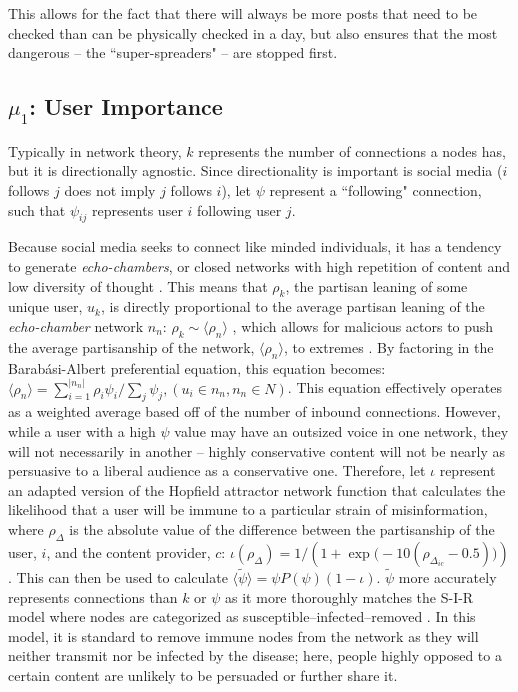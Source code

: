 \documentclass[preprint,12pt]{elsarticle}
\begin{document}
This allows for the fact that there will always be more posts that need to be checked than can be physically checked in a day, but also ensures that the most dangerous -- the ``super-spreaders" -- are stopped first.

\subsection{$\mu_1$: User Importance}
\label{mu1}
Typically in network theory, $k$ represents the number of connections a nodes has, but it is directionally agnostic. Since directionality is important is social media ($i$ follows $j$ does not imply $j$ follows $i$), let $\psi$ represent a ``following" connection, such that $\psi_{ij}$ represents user $i$ following user $j$. 

Because social media seeks to connect like minded individuals, it has a tendency to generate \textit{echo-chambers}, or closed networks with high repetition of content and low diversity of thought \cite{adibi2005proceedings, bastian2009international, pariser2011filter,bozdag2015breaking}. This means that $\rho_k$, the partisan leaning of some unique user, $u_k$, is directly proportional to the average partisan leaning of the \textit{echo-chamber} network $n_n$: $\rho_k \sim \langle \rho_n \rangle$ \cite{asch1956studies,bullock2007experiments}, which allows for malicious actors to push the average partisanship of the network, $\langle \rho_n \rangle$, to extremes \cite{shin2018diffusion,bastos2019brexit,hegelich2016social,mueller2019mueller}. By factoring in the Barab{\'a}si-Albert preferential equation, this equation becomes: $\langle \rho_n \rangle = \sum_{i=1}^{|n_n|}\rho_i\psi_i / \sum_{j}\psi_j, (u_i \in n_n, n_n \in N)$. This equation effectively operates as a weighted average based off of the number of inbound connections. However, while a user with a high $\psi$ value may have an outsized voice in one network, they will not necessarily in another -- highly conservative content will not be nearly as persuasive to a liberal audience as a conservative one. Therefore, let $\iota$ represent an adapted version of the Hopfield attractor network \cite{hopfield1982neural,hopfield1985neural,nowak1998toward,kitts1999structural,macy2003polarization} function that calculates the likelihood that a user will be immune to a particular strain of misinformation, where $\rho_{\Delta}$ is the absolute value of the difference between the partisanship of the user, $i$, and the content provider, $c$: $\iota(\rho_{\Delta})=1 / (1+\exp{\big(-10 (\rho_{\Delta_{ic}}-0.5)\big)})$. This can then be used to calculate $\langle \tilde{\psi} \rangle =  \psi P(\psi)(1-\iota)$. $\tilde{\psi}$ more accurately represents connections than $k$ or $\psi$ as it more thoroughly matches the S-I-R model where nodes are categorized as susceptible–infected–removed \cite{ferrari2006network,bailey1975mathematical,newman2005threshold,newman2002spread}. In this model, it is standard to remove immune nodes from the network as they will neither transmit nor be infected by the disease; here, people highly opposed to a certain content are unlikely to be persuaded or further share it. 
\end{document}
